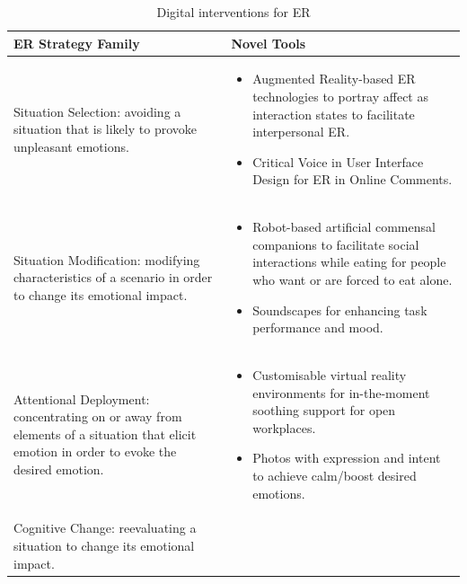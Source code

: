 \documentclass[lettersize,journal]{IEEEtran}
\begin{document}
  
  
\begin{table}[]
\centering
\caption{Digital interventions for ER\cite{smith2022digital}}
\label{tab:my-table}
\begin{tabular}{m{2.7cm}m{5cm}}
\textbf{ER Strategy Family}                                                                                                             & \textbf{Novel Tools}                                                                                                                                                                                                                                                       \\ \hline
Situation Selection: avoiding a situation that is likely to provoke unpleasant emotions.                                                 & \begin{itemize}
\item Augmented Reality-based ER technologies to portray affect as interaction states to facilitate interpersonal ER.
\item Critical Voice in User Interface Design for ER in Online Comments.
\end{itemize}                             \\ \hline
Situation Modification: modifying characteristics of a scenario in order to change its emotional impact.                                 & \begin{itemize}
\item Robot-based artificial commensal companions to facilitate social interactions while eating for people who want or are forced to eat alone. 
\item Soundscapes for enhancing task performance and mood.
\end{itemize}                 \\ \hline
Attentional Deployment: concentrating on or away from elements of a situation that elicit emotion in order to evoke the desired emotion. & \begin{itemize}
\item Customisable virtual reality environments for in-the-moment soothing support for open workplaces.
\item Photos with expression and intent to achieve calm/boost desired emotions.
\end{itemize}                                       \\ \hline
Cognitive Change: reevaluating a situation to change its emotional impact.                                                               & \begin{itemize}

\end{itemize}
\end{tabular}
\end{table}
\end{document}

